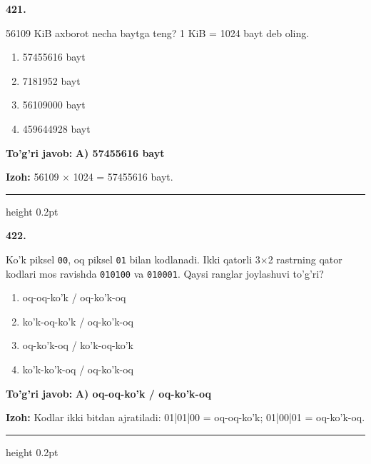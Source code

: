 \documentclass[10pt,a4paper,oneside]{article}
\begin{document}
\noindent\textbf{\color{ink}421.}
\par
56109 KiB axborot necha baytga teng? 1 KiB = 1024 bayt deb oling.
\begin{enumerate}[label=\Alph*),leftmargin=9mm]
\item 57455616 bayt
\item 7181952 bayt
\item 56109000 bayt
\item 459644928 bayt
\end{enumerate}
\begin{tcolorbox}[enhanced,breakable,colback=teal!4,colframe=teal!50!black,boxrule=0.5pt,arc=1.1mm,left=3mm,right=3mm,top=1.7mm,bottom=1.7mm,before skip=2mm,after skip=2mm]
\textbf{\color{teal}To'g'ri javob:} \textbf{A) 57455616 bayt}
\par\smallskip
\textbf{Izoh:} 56109 \ensuremath{\times} 1024 = 57455616 bayt.
\end{tcolorbox}
\vspace{2mm}\hrule height 0.2pt \vspace{3mm}

\noindent\textbf{\color{ink}422.}
\par
Ko'k piksel \texttt{00}, oq piksel \texttt{01} bilan kodlanadi. Ikki qatorli 3\ensuremath{\times}2 rastrning qator kodlari mos ravishda \texttt{010100} va \texttt{010001}. Qaysi ranglar joylashuvi to'g'ri?
\begin{enumerate}[label=\Alph*),leftmargin=9mm]
\item oq-oq-ko'k / oq-ko'k-oq
\item ko'k-oq-ko'k / oq-ko'k-oq
\item oq-ko'k-oq / ko'k-oq-ko'k
\item ko'k-ko'k-oq / oq-ko'k-oq
\end{enumerate}
\begin{tcolorbox}[enhanced,breakable,colback=teal!4,colframe=teal!50!black,boxrule=0.5pt,arc=1.1mm,left=3mm,right=3mm,top=1.7mm,bottom=1.7mm,before skip=2mm,after skip=2mm]
\textbf{\color{teal}To'g'ri javob:} \textbf{A) oq-oq-ko'k / oq-ko'k-oq}
\par\smallskip
\textbf{Izoh:} Kodlar ikki bitdan ajratiladi: 01|01|00 = oq-oq-ko'k; 01|00|01 = oq-ko'k-oq.
\end{tcolorbox}
\vspace{2mm}\hrule height 0.2pt \vspace{3mm}
\end{document}
